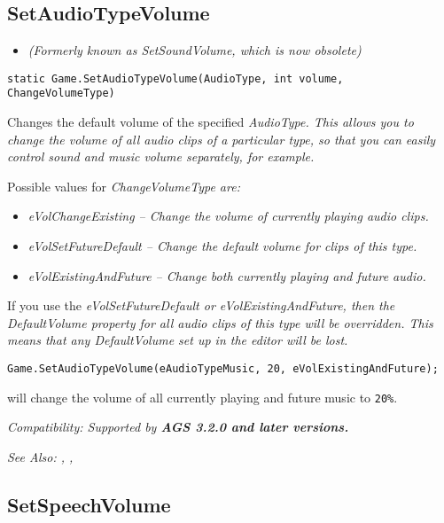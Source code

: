 \subsection{SetAudioTypeVolume}\label{Game.SetAudioTypeVolume}%

\begin{itemize}
\item \it{(Formerly known as SetSoundVolume, which is now obsolete)}
\end{itemize}

\begin{verbatim}
static Game.SetAudioTypeVolume(AudioType, int volume, ChangeVolumeType)
\end{verbatim}
Changes the default volume of the specified \it{AudioType}. This allows you to
change the volume of all audio clips of a particular type, so that you can
easily control sound and music volume separately, for example.

Possible values for \it{ChangeVolumeType} are:
\begin{itemize}
\item \it{eVolChangeExisting} -- Change the volume of currently playing audio clips.
\item \it{eVolSetFutureDefault} -- Change the default volume for clips of this type.
\item \it{eVolExistingAndFuture} -- Change both currently playing and future audio.
\end{itemize}

If you use the \it{eVolSetFutureDefault} or \it{eVolExistingAndFuture}, then
the DefaultVolume property for all audio clips of this type will be overridden.
This means that any DefaultVolume set up in the editor will be lost.

\begin{verbatim}
Game.SetAudioTypeVolume(eAudioTypeMusic, 20, eVolExistingAndFuture);
\end{verbatim}
will change the volume of all currently playing and future music to \verb$20%$.

\it{Compatibility:} Supported by \bf{AGS 3.2.0} and later versions.

\it{See Also:} , ,


\subsection{SetSpeechVolume}\label{SetSpeechVolume}%

